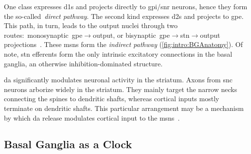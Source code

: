 One class expresses \glspl{d1} and projects directly to \gls{gpi}/\gls{snr} neurons, hence they form the so-called~\emph{direct pathway}.
The second kind expresses \glspl{d2} and projects to \gls{gpe}.
This path, in turn, leads to the output nuclei through two routes:~monosynaptic~\gls{gpe}$\rightarrow$output, or bisynaptic~\gls{gpe}$\rightarrow$\gls{stn}$\rightarrow$output projections~\cite{TURNER2000BasalFunction}.
These \glspl{msn} form the \emph{indirect pathway} (\autoref{fig:intro:BGAnatomy}).
Of note, \gls{stn} efferents form the only intrinsic excitatory connections in the basal ganglia, an otherwise inhibition-dominated structure.
\par
\Gls{da} significantly modulates neuronal activity in the striatum.
Axons from \gls{snc} neurons arborize widely in the striatum.
They mainly target the narrow necks connecting the spines to dendritic shafts, whereas cortical inputs mostly terminate on dendritic shafts.
This particular arrangement may be a mechanism by which \gls{da} release modulates cortical input to the \glspl{msn}~\cite{TURNER2000BasalFunction}.


\subsection{Basal Ganglia as a Clock}
\label{ch:intro:BGTime}

